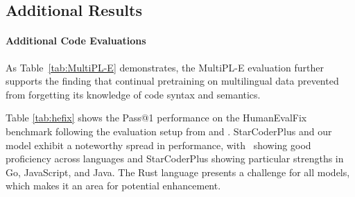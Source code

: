\subsection{Additional Results}
\paragraph{Additional Code Evaluations}\label{app:code_extra}
As Table~\ref{tab:MultiPL-E} demonstrates, the MultiPL-E evaluation further supports the finding that continual pretraining on multilingual data prevented {\system} from forgetting its knowledge of code syntax and semantics.

Table \ref{tab:hefix} shows the Pass@1 performance on the HumanEvalFix benchmark following the evaluation setup from \citet{muennighoff2023octopack} and \citet{zhuo2024astraios}. StarCoderPlus and our model exhibit a noteworthy spread in performance, with \system\ showing good proficiency across languages and StarCoderPlus showing particular strengths in Go, JavaScript, and Java. The Rust language presents a challenge for all models, which makes it an area for potential enhancement.

